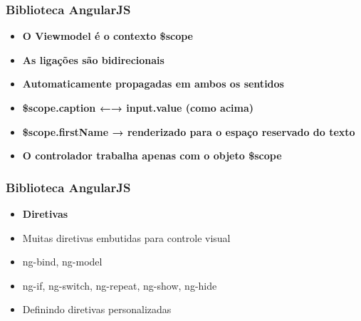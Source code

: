 \documentclass{beamer}
\begin{document}
\begin{frame}
      \frametitle{Biblioteca AngularJS}

      \begin{itemize}
            \item \textbf{O Viewmodel é o contexto \$scope}
            \item \textbf{As ligações são bidirecionais}
            \item \textbf{Automaticamente propagadas em ambos os sentidos}
            \item \textbf{\$scope.caption ←→ input.value (como acima)}
            \item \textbf{\$scope.firstName → renderizado para o espaço reservado do texto}
            \item \textbf{O controlador trabalha apenas com o objeto \$scope}
      \end{itemize}

\end{frame}

\begin{frame}
      \frametitle{Biblioteca AngularJS}

      \begin{itemize}
            \item \textbf{Diretivas}
            \item Muitas diretivas embutidas para controle visual
            \item ng-bind, ng-model
            \item ng-if, ng-switch, ng-repeat, ng-show, ng-hide
            \item Definindo diretivas personalizadas
      \end{itemize}

\end{frame}
\end{document}
